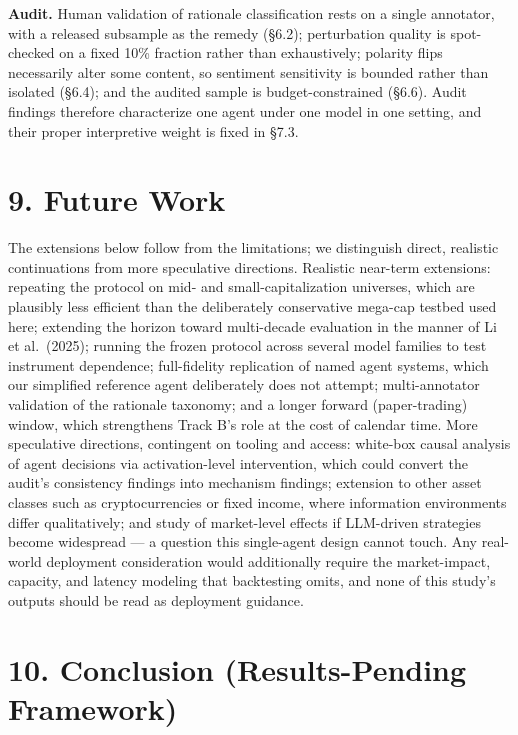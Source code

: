\documentclass[
  12pt,
]{article}
\begin{document}
\textbf{Audit.} Human validation of rationale classification rests on a
single annotator, with a released subsample as the remedy (§6.2);
perturbation quality is spot-checked on a fixed 10\% fraction rather
than exhaustively; polarity flips necessarily alter some content, so
sentiment sensitivity is bounded rather than isolated (§6.4); and the
audited sample is budget-constrained (§6.6). Audit findings therefore
characterize one agent under one model in one setting, and their proper
interpretive weight is fixed in §7.3.

\hypertarget{future-work}{%
\section{9. Future Work}\label{future-work}}

The extensions below follow from the limitations; we distinguish direct,
realistic continuations from more speculative directions. Realistic
near-term extensions: repeating the protocol on mid- and
small-capitalization universes, which are plausibly less efficient than
the deliberately conservative mega-cap testbed used here; extending the
horizon toward multi-decade evaluation in the manner of Li et
al.~(2025); running the frozen protocol across several model families to
test instrument dependence; full-fidelity replication of named agent
systems, which our simplified reference agent deliberately does not
attempt; multi-annotator validation of the rationale taxonomy; and a
longer forward (paper-trading) window, which strengthens Track B's role
at the cost of calendar time. More speculative directions, contingent on
tooling and access: white-box causal analysis of agent decisions via
activation-level intervention, which could convert the audit's
consistency findings into mechanism findings; extension to other asset
classes such as cryptocurrencies or fixed income, where information
environments differ qualitatively; and study of market-level effects if
LLM-driven strategies become widespread --- a question this single-agent
design cannot touch. Any real-world deployment consideration would
additionally require the market-impact, capacity, and latency modeling
that backtesting omits, and none of this study's outputs should be read
as deployment guidance.

\hypertarget{conclusion-results-pending-framework}{%
\section{10. Conclusion (Results-Pending
Framework)}\label{conclusion-results-pending-framework}}
\end{document}
